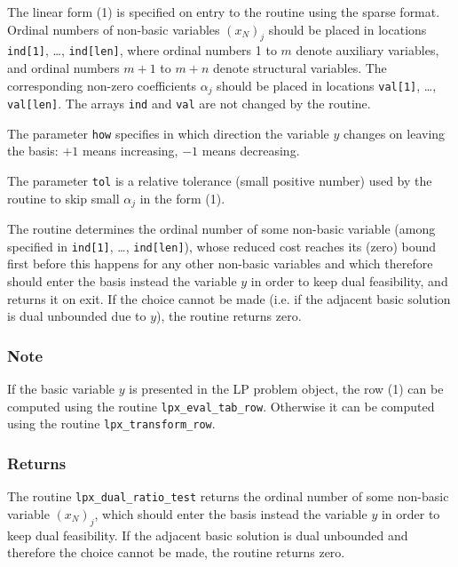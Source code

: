 The linear form (1) is specified on entry to the routine using the
sparse format. Ordinal numbers of non-basic variables $(x_N)_j$ should
be placed in locations \verb|ind[1]|, \dots, \verb|ind[len]|, where
ordinal numbers 1 to $m$ denote auxiliary variables, and ordinal numbers
$m+1$ to $m+n$ denote structural variables. The corresponding non-zero
coefficients $\alpha_j$ should be placed in locations \verb|val[1]|,
\dots, \verb|val[len]|. The arrays \verb|ind| and \verb|val| are not
changed by the routine.

The parameter \verb|how| specifies in which direction the variable $y$
changes on leaving the basis: $+1$ means increasing, $-1$ means
decreasing.

The parameter \verb|tol| is a relative tolerance (small positive number)
used by the routine to skip small $\alpha_j$ in the form (1).

The routine determines the ordinal number of some non-basic variable
(among specified in \verb|ind[1]|, \dots, \verb|ind[len]|), whose
reduced cost reaches its (zero) bound first before this happens for any
other non-basic variables and which therefore should enter the basis
instead the variable $y$ in order to keep dual feasibility, and returns
it on exit. If the choice cannot be made (i.e. if the adjacent basic
solution is dual unbounded due to $y$), the routine returns zero.

\subsubsection*{Note}

If the basic variable $y$ is presented in the LP problem object, the
row (1) can be computed using the routine \verb|lpx_eval_tab_row|.
Otherwise it can be computed using the routine \verb|lpx_transform_row|.

\subsubsection*{Returns}

The routine \verb|lpx_dual_ratio_test| returns the ordinal number of
some non-basic variable $(x_N)_j$, which should enter the basis instead
the variable $y$ in order to keep dual feasibility. If the adjacent
basic solution is dual unbounded and therefore the choice cannot be
made, the routine returns zero.


